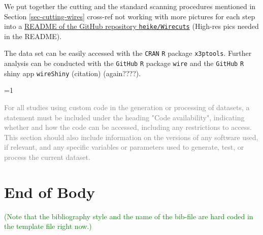 \documentclass[fleqn,10pt]{wlscirep}
\newcommand{\tom}[1]{{\textcolor{RedOrange}{#1}}}
\newcommand{\hh}[1]{{\textcolor{Green}{#1}}}
\newcommand{\ifinstruction}{1} %
\begin{document}
We put together the cutting and the standard scanning procedures
mentioned in Section \ref{sec-cutting-wires} \tom{cross-ref not working}
with more pictures for each step into a
\href{https://github.com/heike/Wirecuts/blob/main/README.md}{README of the GitHub repository \texttt{heike/Wirecuts}}
\tom{(High-res pics needed in the README)}.

The data set can be easily accessed with the \texttt{CRAN} \texttt{R}
package \texttt{x3ptools}. Further analysis can be conducted with the
\texttt{GitHub} \texttt{R} package \texttt{wire} and the \texttt{GitHub}
\texttt{R} shiny app \texttt{wireShiny} \tom{(citation)}
\tom{(again????)}.

\ifnum \ifinstruction=1

\textcolor{gray}{For all studies using custom code in the generation or processing of datasets, a statement must be included under the heading "Code availability", indicating whether and how the code can be accessed, including any restrictions to access. This section should also include information on the versions of any software used, if relevant, and any specific variables or parameters used to generate, test, or process the current dataset.}
\fi

\section{End of Body}\label{end-of-body}

\hh{(Note that the bibliography style and the name of the bib-file are hard coded in the template file right now.)}
\end{document}
